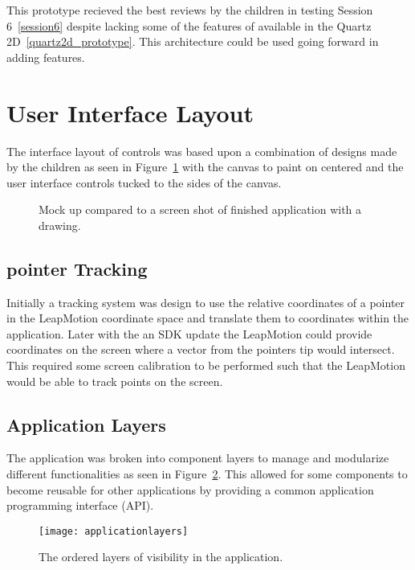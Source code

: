 This prototype recieved the best reviews by the children in testing Session 6~\ref{session6} despite lacking some of the features of available in the Quartz 2D~\ref{quartz2d_prototype}. This architecture could be used going forward in adding features.



\section{User Interface Layout}
The interface layout of controls was based upon a combination of designs made by the children as seen in Figure~\ref{fig:LeapPaintScreenshot} with the canvas to paint on centered and the user interface controls tucked to the sides of the canvas. 


\begin{figure}
\centering     %
{}
\caption{Mock up compared to a screen shot of finished application with a drawing. }
\label{fig:LeapPaintScreenshot}
\end{figure}



\subsection{pointer Tracking}
Initially a tracking system was design to use the relative coordinates of a pointer in the LeapMotion coordinate space and translate them to coordinates within the application. Later with the an SDK update the LeapMotion could provide coordinates on the screen where a vector from the pointers tip would intersect. This required some screen calibration to be performed such that the LeapMotion would be able to track points on the screen. 

\subsection{Application Layers}
The application was broken into component layers to manage and modularize different functionalities as seen in Figure~\ref{fig:applicationlayers}. This allowed for some components to become reusable for other applications by providing a common application programming interface (API). 

\begin{figure}
\centering
\texttt{[image: applicationlayers]}
\caption{The ordered layers of visibility in the application. }
\label{fig:applicationlayers}
\end{figure}

